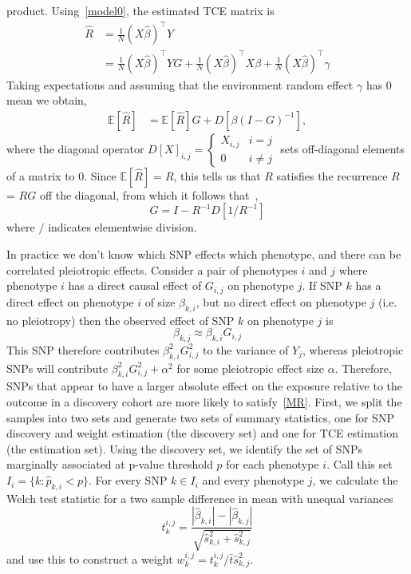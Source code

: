 \documentclass{article}
\begin{document}
product. Using~\eqref{model0}, the estimated TCE matrix is
\begin{align*}
\hat{R} &= \frac{1}{N} (X\hat{\beta})^{\top} Y \\
  &= \frac{1}{N} (X\hat{\beta})^{\top} Y G + \frac{1}{N}(X\hat{\beta})^{\top} X \beta +
     \frac{1}{N}(X\hat{\beta})^{\top} \gamma
  \end{align*}
Taking expectations and assuming that the environment random effect $\gamma$ has 0 mean we obtain,
\begin{align*}
\mathbb{E}[\hat{R}]  &= \mathbb{E}[\hat{R}] G + D[\beta (I-G)^{-1}],
\end{align*}
where the diagonal operator $D[X]_{i,j} = \left\{ \begin{array}{ll}
  X_{i,j} & i=j \\ 0 & i \neq j \end{array} \right.$ sets off-diagonal elements
  of a matrix to 0.
  Since $\mathbb{E}[\hat{R}] = R$,
this tells us that $R$ satisfies the recurrence
  $R$ = $R G$ off the diagonal, from
  which it follows that~\cite{Pachter},
\begin{equation}\label{r_dce}
G = I - R^{-1} D[1 / R^{-1}]
\end{equation}
where $/$ indicates elementwise division.

In practice we don't know which SNP effects which phenotype,
and there can be correlated pleiotropic effects.
Consider a pair of phenotypes $i$ and $j$ where phenotype $i$ has a direct causal
effect of $G_{i, j}$ on phenotype $j$. If SNP $k$ has a direct effect on phenotype $i$
of size $\beta_{k, i}$, but no direct effect on phenotype $j$ (i.e. no pleiotropy)
then the observed effect of SNP $k$ on phenotype $j$ is
\begin{equation}\label{MR}
\beta_{k,j} \approx \beta_{k,i} G_{i,j}
\end{equation}
This SNP therefore contributes
$\beta_{k, i}^2 G_{i, j}^2$ to the variance of $Y_j$, whereas
pleiotropic SNPs will contribute $\beta_{k, i}^2 G_{i, j}^2 + \alpha^2$
for some pleiotropic effect size $\alpha$. Therefore, SNPs that appear to
have a larger absolute effect on the exposure relative to the outcome in a discovery 
cohort are more likely to satisfy~\eqref{MR}.
First, we split the samples into two sets and generate two sets of summary statistics,
one for SNP discovery and weight estimation (the discovery set) and one for TCE estimation
(the estimation set). Using the discovery set, we identify the set of SNPs marginally
associated at p-value threshold $p$ for each phenotype $i$.
Call this set $I_i = \{k: \hat{p}_{k, i} < p\}$. For every SNP $k \in I_i$ and
every phenotype $j$, we calculate the Welch test statistic for a two sample difference in mean with
unequal variances~\cite{Welch1947}
\begin{equation}
t^{i,j}_k = \frac{|\hat{\beta}_{k, i}| - |\hat{\beta}_{k, j}|}
  {\sqrt{\hat{s}^2_{k, i} + \hat{s}^2_{k, j}}}
\end{equation}
and use this to construct a weight $w^{i, j}_k = t^{i,j}_k/\bar{t} \hat{s}_{k, j}^2$.
  
\end{document}
